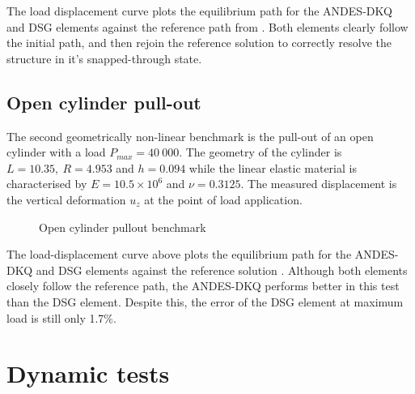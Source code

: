 
The load displacement curve plots the equilibrium path for the ANDES-DKQ and DSG elements against the reference path from \cite{Sze2004}. Both elements clearly follow the initial path, and then rejoin the reference solution to correctly resolve the structure in it's snapped-through state.

\newpage
\subsection{Open cylinder pull-out}

The second geometrically non-linear benchmark is the pull-out of an open cylinder with a load $P_{max} = 40\ 000$. The geometry of the cylinder is $L= 10.35,\ R = 4.953$ and $h = 0.094$ while the linear elastic material is characterised by $E = 10.5\times10^6$ and $\nu = 0.3125$. The measured displacement is the vertical deformation $u_z$ at the point of load application.

 
\begin{figure}[H]
	\caption{\label{ref_label_overall}Open cylinder pullout benchmark}
\end{figure}

 The load-displacement curve above plots the equilibrium path for the ANDES-DKQ and DSG elements against the reference solution \cite{Sze2004}. Although both elements closely follow the reference path, the ANDES-DKQ performs better in this test than the DSG element. Despite this, the error of the DSG element at maximum load is still only 1.7\%.

\section{Dynamic tests}

